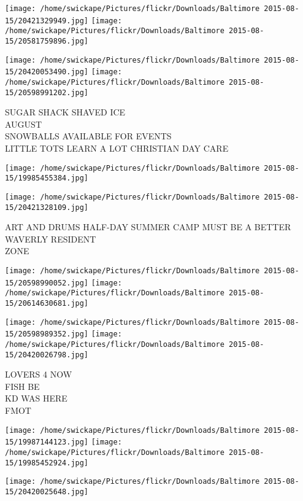 \documentclass[10pt,letterpaper]{article}
\begin{document}
\texttt{[image: /home/swickape/Pictures/flickr/Downloads/Baltimore 2015-08-15/20421329949.jpg]}
\texttt{[image: /home/swickape/Pictures/flickr/Downloads/Baltimore 2015-08-15/20581759896.jpg]}

\texttt{[image: /home/swickape/Pictures/flickr/Downloads/Baltimore 2015-08-15/20420053490.jpg]}
\texttt{[image: /home/swickape/Pictures/flickr/Downloads/Baltimore 2015-08-15/20598991202.jpg]}

SUGAR SHACK SHAVED ICE\\
AUGUST\\
SNOWBALLS AVAILABLE FOR EVENTS\\
LITTLE TOTS LEARN A LOT CHRISTIAN DAY CARE\\
\pagebreak

\texttt{[image: /home/swickape/Pictures/flickr/Downloads/Baltimore 2015-08-15/19985455384.jpg]}

\vspace{0.25in}
\texttt{[image: /home/swickape/Pictures/flickr/Downloads/Baltimore 2015-08-15/20421328109.jpg]}

ART AND DRUMS HALF{-}DAY SUMMER CAMP MUST BE A BETTER WAVERLY RESIDENT\\
ZONE\\
\pagebreak

\texttt{[image: /home/swickape/Pictures/flickr/Downloads/Baltimore 2015-08-15/20598990052.jpg]}
\texttt{[image: /home/swickape/Pictures/flickr/Downloads/Baltimore 2015-08-15/20614630681.jpg]}

\texttt{[image: /home/swickape/Pictures/flickr/Downloads/Baltimore 2015-08-15/20598989352.jpg]}
\texttt{[image: /home/swickape/Pictures/flickr/Downloads/Baltimore 2015-08-15/20420026798.jpg]}

LOVERS 4 NOW\\
FISH BE\\
KD WAS HERE\\
FMOT\\
\pagebreak

\texttt{[image: /home/swickape/Pictures/flickr/Downloads/Baltimore 2015-08-15/19987144123.jpg]}
\texttt{[image: /home/swickape/Pictures/flickr/Downloads/Baltimore 2015-08-15/19985452924.jpg]}

\vspace{0.25in}
\texttt{[image: /home/swickape/Pictures/flickr/Downloads/Baltimore 2015-08-15/20420025648.jpg]}
\end{document}
